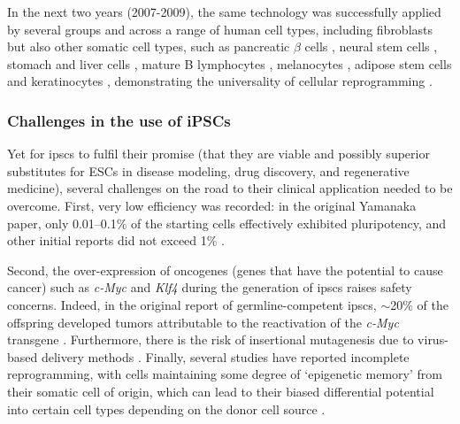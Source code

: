 In the next two years (2007-2009), the same technology was successfully applied by several groups and across a range of human cell types, including fibroblasts \cite{park2008reprogramming} but also other somatic cell types, such as pancreatic $\beta$ cells \cite{stadtfeld2008reprogramming}, neural stem cells \cite{eminli2008reprogramming, kim2008pluripotent}, stomach and liver cells \cite{aoi2008generation}, mature B lymphocytes \cite{hanna2008direct}, melanocytes \cite{utikal2009sox2}, adipose stem cells \cite{sun2009feeder} and keratinocytes \cite{maherali2008high}, demonstrating the universality of cellular reprogramming \cite{omole2018ten}.


\subsubsection{Challenges in the use of iPSCs}
Yet for \glspl{ipsc} to fulfil their promise (that they are viable and possibly superior substitutes for ESCs in disease modeling, drug discovery, and regenerative medicine), several challenges on the road to their clinical application needed to be overcome.
First, very low efficiency was recorded: in the original Yamanaka paper, only 0.01–0.1\% \cite{takahashi2006induction} of the starting cells effectively exhibited pluripotency, and other initial reports did not exceed 1\% \cite{takahashi2007induction, okita2007generation, lowry2008generation}.

Second, the over-expression of oncogenes (genes that have the potential to cause cancer) such as \textit{c-Myc} and \textit{Klf4} during the generation of \glspl{ipsc} raises safety concerns.
Indeed, in the original report of germline-competent \glspl{ipsc}, $\sim$20\% of the offspring developed tumors attributable to the reactivation of the \textit{c-Myc} transgene \cite{okita2007generation}. 
Furthermore, there is the risk of insertional mutagenesis due to virus-based delivery methods \cite{takahashi2006induction, takahashi2007induction, yu2007induced}. 
Finally, several studies have reported incomplete reprogramming, with cells maintaining some degree of `epigenetic memory' from their somatic cell of origin, which can lead to their biased differential potential into certain cell types depending on the donor cell source \cite{kim2010epigenetic, polo2010cell}.\\

